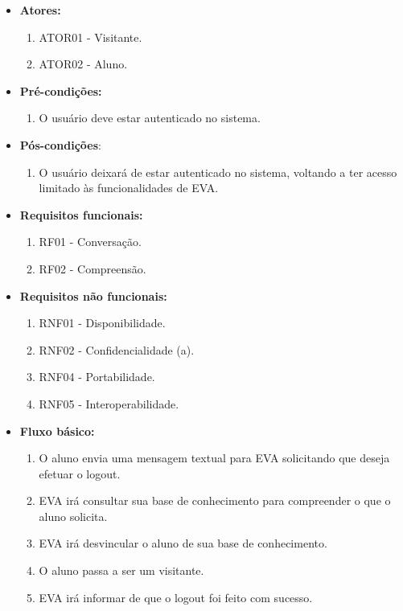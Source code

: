 \begin{itemize}
    \item \textbf{Atores:}
        \begin{enumerate}
            \item ATOR01 - Visitante.
            \item ATOR02 - Aluno.
        \end{enumerate}
    \item \textbf{Pré-condições:}
        \begin{enumerate}
            \item O usuário deve estar autenticado no sistema.
        \end{enumerate}
    \item \textbf{Pós-condições}:
        \begin{enumerate}
            \item O usuário deixará de estar autenticado no sistema, voltando a ter acesso limitado às funcionalidades de EVA.
        \end{enumerate}
    \item \textbf{Requisitos funcionais:}
        \begin{enumerate}
            \item RF01 - Conversação.
            \item RF02 - Compreensão.
        \end{enumerate}
    \item \textbf{Requisitos não funcionais:}
        \begin{enumerate}
            \item RNF01 - Disponibilidade.
            \item RNF02 - Confidencialidade (a).
            \item RNF04 - Portabilidade.
            \item RNF05 - Interoperabilidade.
        \end{enumerate}
    \item \textbf{Fluxo básico:}
        \begin{enumerate}
            \item O aluno envia uma mensagem textual para EVA solicitando que deseja efetuar o logout.
            \item EVA irá consultar sua base de conhecimento para compreender o que o aluno solicita.
            \item EVA irá desvincular o aluno de sua base de conhecimento.
            \item O aluno passa a ser um visitante.
            \item EVA irá informar de que o logout foi feito com sucesso.
        \end{enumerate}
\end{itemize}


